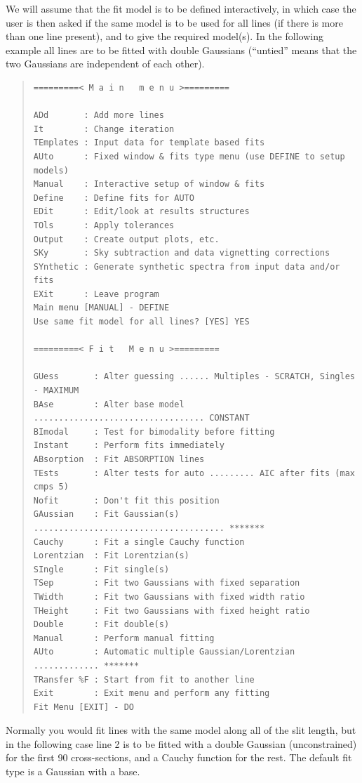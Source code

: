 We will assume that the fit model is to be defined
interactively, in which case the user is then asked if the same
model is to be used for all lines (if there is more than one line
present), and to give the required model(s).
In the following example all lines are to be fitted with double
Gaussians (``untied'' means that the two Gaussians are independent of
each other).

\begin{quote}\begin{small}\begin{verbatim}
=========< M a i n   m e n u >=========
 
ADd       : Add more lines
It        : Change iteration
TEmplates : Input data for template based fits
AUto      : Fixed window & fits type menu (use DEFINE to setup models)
Manual    : Interactive setup of window & fits
Define    : Define fits for AUTO
EDit      : Edit/look at results structures
TOls      : Apply tolerances
Output    : Create output plots, etc.
SKy       : Sky subtraction and data vignetting corrections
SYnthetic : Generate synthetic spectra from input data and/or fits
EXit      : Leave program
Main menu [MANUAL] - DEFINE
Use same fit model for all lines? [YES] YES

=========< F i t   M e n u >=========

GUess       : Alter guessing ...... Multiples - SCRATCH, Singles - MAXIMUM
BAse        : Alter base model .................................. CONSTANT
BImodal     : Test for bimodality before fitting
Instant     : Perform fits immediately
ABsorption  : Fit ABSORPTION lines
TEsts       : Alter tests for auto ......... AIC after fits (max cmps 5)
Nofit       : Don't fit this position
GAussian    : Fit Gaussian(s) ...................................... *******
Cauchy      : Fit a single Cauchy function
Lorentzian  : Fit Lorentzian(s)
SIngle      : Fit single(s)
TSep        : Fit two Gaussians with fixed separation
TWidth      : Fit two Gaussians with fixed width ratio
THeight     : Fit two Gaussians with fixed height ratio
Double      : Fit double(s)
Manual      : Perform manual fitting
AUto        : Automatic multiple Gaussian/Lorentzian ............. *******
TRansfer %F : Start from fit to another line
Exit        : Exit menu and perform any fitting
Fit Menu [EXIT] - DO
\end{verbatim}\end{small}\end{quote}

Normally you would fit lines with the same model along all of
the slit length, but in the following case line 2 is to be fitted with a
double Gaussian (unconstrained) for the first 90 cross-sections, and a
Cauchy function for the rest.
The default fit type is a Gaussian with a base.

